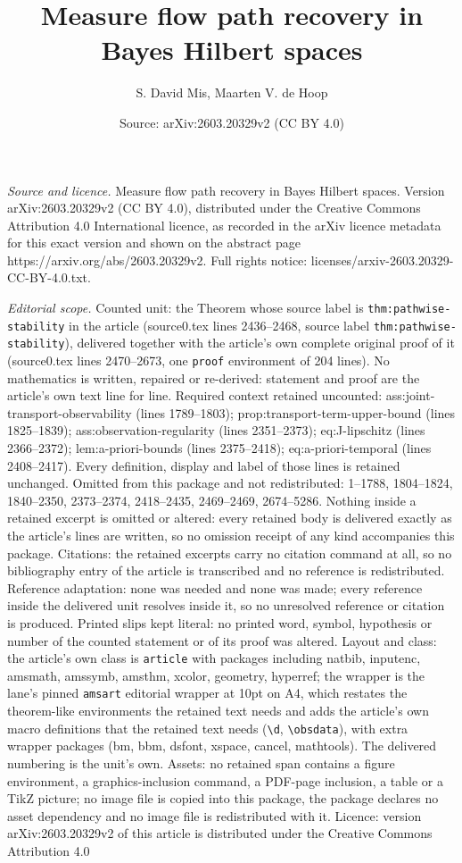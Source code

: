 \documentclass[10pt,a4paper]{amsart}
\title[Measure flow path recovery in Bayes Hilbert spaces]{Measure flow path recovery in Bayes Hilbert spaces}
\author{S. David Mis, Maarten V. de Hoop}
\date{Source: arXiv:2603.20329v2 (CC BY 4.0)}
\begin{document}
\maketitle

\noindent\emph{Source and licence.} Measure flow path recovery in Bayes Hilbert spaces. Version arXiv:2603.20329v2 (CC BY 4.0), distributed under the Creative Commons Attribution 4.0 International licence, as recorded in the arXiv licence metadata for this exact version and shown on the abstract page https://arxiv.org/abs/2603.20329v2. Full rights notice: licenses/arxiv-2603.20329-CC-BY-4.0.txt.\par\smallskip

\noindent\textit{Editorial scope.} Counted unit: the Theorem whose source label is \texttt{thm:pathwise-stability} in the article (source0.tex lines 2436--2468, source label \texttt{thm:pathwise-stability}), delivered together with the article's own complete original proof of it (source0.tex lines 2470--2673, one \texttt{proof} environment of 204 lines). No mathematics is written, repaired or re-derived: statement and proof are the article's own text line for line. Required context retained uncounted: ass:joint-transport-observability (lines 1789--1803); prop:transport-term-upper-bound (lines 1825--1839); ass:observation-regularity (lines 2351--2373); eq:J-lipschitz (lines 2366--2372); lem:a-priori-bounds (lines 2375--2418); eq:a-priori-temporal (lines 2408--2417). Every definition, display and label of those lines is retained unchanged. Omitted from this package and not redistributed: 1--1788, 1804--1824, 1840--2350, 2373--2374, 2418--2435, 2469--2469, 2674--5286. Nothing inside a retained excerpt is omitted or altered: every retained body is delivered exactly as the article's lines are written, so no omission receipt of any kind accompanies this package. Citations: the retained excerpts carry no citation command at all, so no bibliography entry of the article is transcribed and no reference is redistributed. Reference adaptation: none was needed and none was made; every reference inside the delivered unit resolves inside it, so no unresolved reference or citation is produced. Printed slips kept literal: no printed word, symbol, hypothesis or number of the counted statement or of its proof was altered. Layout and class: the article's own class is \texttt{article} with packages including natbib, inputenc, amsmath, amssymb, amsthm, xcolor, geometry, hyperref; the wrapper is the lane's pinned \texttt{amsart} editorial wrapper at 10pt on A4, which restates the theorem-like environments the retained text needs and adds the article's own macro definitions that the retained text needs (\texttt{\textbackslash d}, \texttt{\textbackslash obsdata}), with extra wrapper packages (bm, bbm, dsfont, xspace, cancel, mathtools). The delivered numbering is the unit's own. Assets: no retained span contains a figure environment, a graphics-inclusion command, a PDF-page inclusion, a table or a TikZ picture; no image file is copied into this package, the package declares no asset dependency and no image file is redistributed with it. Licence: version arXiv:2603.20329v2 of this article is distributed under the Creative Commons Attribution 4.0 
\end{document}
